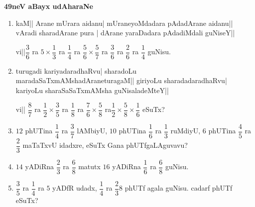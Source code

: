 \eject

\begin{center}
{\bf\Large 49neV aBayx udAharaNe}
\end{center}

\begin{enumerate}[\rm (1)]
\item kaM|| Arane mUrara aidanu| mUraneyoMdadara pAdadArane aidanu|| vAradi sharadArane pura | dArane yaraDadara pAdadiMdali guNiseY||

vi||$\dfrac{3}{6}$ ra $5\times \dfrac{1}{3}$ ra $\dfrac{1}{4}$ ra $\dfrac{5}{6}\times\dfrac{5}{7}$ ra $\dfrac{3}{6}$ ra $\dfrac{2}{6}$ ra $\dfrac{1}{4}$ guNisu.

\item turugadi kariyadaradhaRvu| sharadoLu maradaSaTxmAMshadAraneturagaM|| giriyoLu sharadadaradhaRvu| kariyoLu sharaSaSaTxmAMsha guNisaladeMteY||

vi|| $\dfrac{8}{7}$ ra $\dfrac{1}{2}\times\dfrac{3}{5}$ ra $\dfrac{1}{8}$ ra $\dfrac{7}{6}\times\dfrac{5}{8}$ ra$\dfrac{1}{2}\times\dfrac{5}{8}\times\dfrac{1}{6}$ eSuTx?

\item $12$ phUTina $\dfrac{1}{4}$ ra $\dfrac{3}{7}$ lAMbiyU, $10$ phUTina $\dfrac{1}{6}$ ra $\dfrac{1}{3}$ ruMdiyU, $6$ phUTina $\dfrac{4}{5}$ ra $\dfrac{2}{3}$ maTaTxvU idadxre, eSuTx Gana phUTfgaLAguvavu?

\item $14$ yADiRna $\dfrac{2}{3}$ ra $\dfrac{6}{8}$ matutx $16$ yADiRna $\dfrac{1}{6}$ ra $\dfrac{6}{8}$ guNisu. 

\item $\dfrac{3}{5}$ ra $\dfrac{1}{4}$ ra $5$ yADfR udadx, $\dfrac{1}{4}$ ra $\dfrac{2}{3} 8$ phUTf agala guNisu. cadarf phUTf eSuTx?
\end{enumerate}

